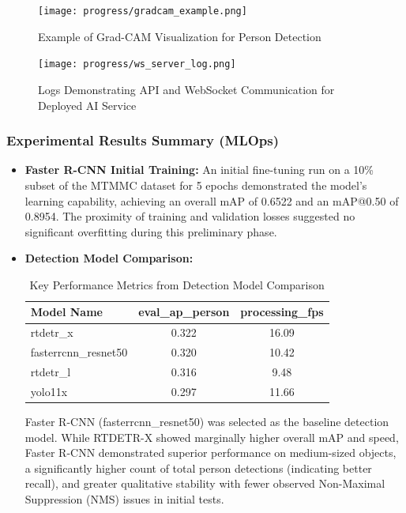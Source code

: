 \begin{figure}[!htb]
    \centering
    \texttt{[image: progress/gradcam\_example.png]}
    \caption{Example of Grad-CAM Visualization for Person Detection}
    \label{fig:progress_gradcam_example}
\end{figure}

\begin{figure}[!htb]
    \centering
    \texttt{[image: progress/ws\_server\_log.png]}
    \caption{Logs Demonstrating API and WebSocket Communication for Deployed AI Service}
    \label{fig:progress_api_logs}
\end{figure}
\clearpage

\subsubsection*{Experimental Results Summary (MLOps)}
\begin{itemize}
    \item \textbf{Faster R-CNN Initial Training:} An initial fine-tuning run on a 10\% subset of the MTMMC dataset for 5 epochs demonstrated the model's learning capability, achieving an overall mAP of 0.6522 and an mAP@0.50 of 0.8954. The proximity of training and validation losses suggested no significant overfitting during this preliminary phase.
    \item \textbf{Detection Model Comparison:}
        \begin{table}[!htb]
          \centering
          \caption{Key Performance Metrics from Detection Model Comparison}
          \label{tab:progress_model_comparison_summary}
          \begin{tabular}{@{}lcc@{}}
            \toprule
            Model Name & eval\_ap\_person & processing\_fps \\ \midrule
            {rtdetr\_x} & 0.322 & 16.09 \\
            {fasterrcnn\_resnet50} & 0.320 & 10.42 \\
            {rtdetr\_l} & 0.316 & 9.48 \\
            {yolo11x} & 0.297 & 11.66 \\ \bottomrule
          \end{tabular}%
        \end{table}
    
        Faster R-CNN (fasterrcnn\_resnet50) was selected as the baseline detection model. While RTDETR-X showed marginally higher overall mAP and speed, Faster R-CNN demonstrated superior performance on medium-sized objects, a significantly higher count of total person detections (indicating better recall), and greater qualitative stability with fewer observed Non-Maximal Suppression (NMS) issues in initial tests.
\end{itemize}

